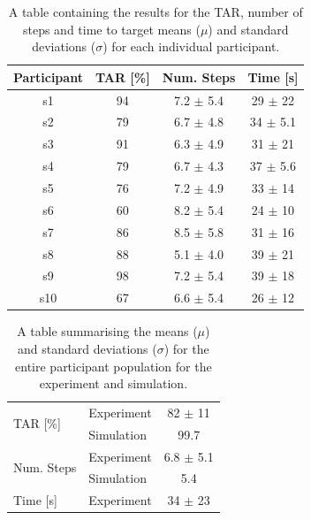 \documentclass[a4paper, twoside]{article}
\begin{document}
\begin{table}
  \centering
  \caption{A table containing the results for the TAR, number of steps and time to target means ($\mu$) and standard deviations ($\sigma$) for each individual participant.}\label{tab:results-full}
  \begin{tabular}{cccc}
    \toprule
    Participant & TAR [\%] & Num. Steps & Time [s] \\ \midrule
    s1 & 94 & 7.2 $\pm$ 5.4 & 29 $\pm$ 22 \\ \midrule
    s2 & 79 & 6.7 $\pm$ 4.8 & 34 $\pm$ 5.1 \\ \midrule
    s3 & 91 & 6.3 $\pm$ 4.9 & 31 $\pm$ 21 \\ \midrule
    s4 & 79 & 6.7 $\pm$ 4.3 & 37 $\pm$ 5.6 \\ \midrule
    s5 & 76 & 7.2 $\pm$ 4.9 & 33 $\pm$ 14 \\ \midrule
    s6 & 60 & 8.2 $\pm$ 5.4 & 24 $\pm$ 10 \\ \midrule
    s7 & 86 & 8.5 $\pm$ 5.8 & 31 $\pm$ 16 \\ \midrule
    s8 & 88 & 5.1 $\pm$ 4.0 & 39 $\pm$ 21 \\ \midrule
    s9 & 98 & 7.2 $\pm$ 5.4 & 39 $\pm$ 18 \\ \midrule
    s10 & 67 & 6.6 $\pm$ 5.4 & 26 $\pm$ 12 \\ \midrule
    \bottomrule                    
  \end{tabular}                    
\end{table}                        
                                   
\begin{table}                      
  \centering                       
  \caption{A table summarising the means ($\mu$) and standard deviations ($\sigma$) for the entire participant population for the experiment and simulation.}\label{tab:results-summary}
  \begin{tabular}{llc}
    \toprule
    \multirow{2}{*}{TAR [\%]} & Experiment & 82 $\pm$ 11  \\ 
			      & Simulation & 99.7 \\ \midrule
    \multirow{2}{*}{Num. Steps} & Experiment & 6.8 $\pm$ 5.1 \\ 
			        & Simulation & 5.4 \\ \midrule
    Time [s] & Experiment & 34 $\pm$ 23  \\ \midrule
    \bottomrule
  \end{tabular}
\end{table}
\end{document}
